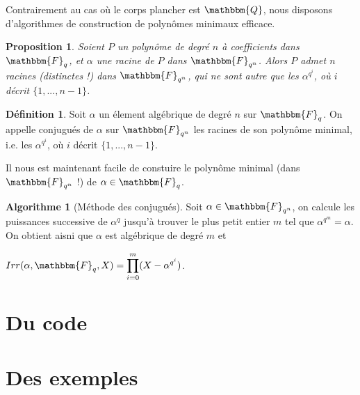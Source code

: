 \documentclass[12pt]{article}
\newcommand{\Q}{\mathbbm{Q}}
\newcommand{\Fq}{\mathbbm{F}_q}
\newcommand{\Fqn}{\mathbbm{F}_{q^n}}
\newtheorem{prop}{Proposition}
\theoremstyle{definition}\newtheorem{defn}{Définition}
\theoremstyle{definition}\newtheorem{exm}{Exemple}
\theoremstyle{definition}\newtheorem{rem}{Remarque}
\theoremstyle{definition}\newtheorem{algo}{Algorithme}
\theoremstyle{remark}\newtheorem{exo}{Exercice}
\theoremstyle{remark}\newtheorem{nota}{Notation}
\begin{document}
Contrairement au cas où le corps plancher est $\Q$, nous disposons d'algorithmes de construction de polynômes minimaux efficace. 

\begin{prop}
Soient $P$ un polynôme de degré $n$ à coefficients dans $\Fq$, et $\alpha$ une racine de $P$ dans $\Fqn$. Alors $P$ admet $n$ racines (distinctes !) dans $\Fqn$, qui ne sont autre que les $\alpha^{q^i}$, où $i$ décrit $\{1, ..., n-1\}$.
\end{prop}

\begin{defn}
Soit $\alpha$ un élement algébrique de degré $n$ sur $\Fq$. On appelle conjugués de $\alpha$ sur $\Fqn$ les racines de son polynôme minimal, i.e. les $\alpha^{q^i}$, où $i$ décrit $\{1, ..., n-1\}$.
\end{defn}

Il nous est maintenant facile de constuire le polynôme minimal (dans $\Fqn$ !) de $\alpha \in \Fq$.

\begin{algo}[Méthode des conjugués]
Soit $\alpha \in \Fqn$, on calcule les puissances successive de $\alpha^{q}$ jusqu'à trouver le plus petit entier $m$ tel que $\alpha^{q^m} = \alpha$. On obtient aisni que $\alpha$ est algébrique de degré $m$ et 
\begin{center} $Irr(\alpha, \Fq, X) = \displaystyle \prod_{i=0}^m (X-\alpha^{q^i})$. \end{center}
\end{algo}



\pagebreak
\section{Du code}




\pagebreak
\section{Des exemples}





\pagebreak


\end{document}
